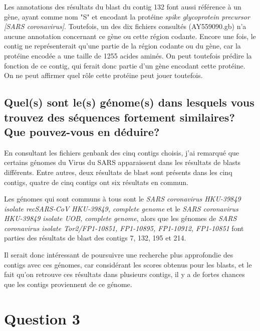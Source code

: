\documentclass[10.9pt]{article} %
\begin{document}
Les annotations des résultats du blast du contig 132 font aussi référence à un gène, ayant comme 
nom "S" et encodant la protéine \emph{spike glycoprotein precursor [SARS coronavirus]}. 
Toutefois, un des dix fichiers consultés (AY559090.gb) n'a aucune annotation concernant ce gène ou
cette région codante. Encore une fois, le contig ne représenterait qu'une partie de la 
région codante ou du gène, car la protéine encodée a une taille de 1255 acides aminés. 
On peut toutefois prédire la fonction de ce contig, qui ferait donc partie d'un gène encodant
cette protéine. On ne peut affirmer quel rôle cette protéine peut jouer toutefois.

\subsection[Génome des séquences fortement similaires]{Quel(s) sont le(s) génome(s) dans lesquels
vous trouvez des séquences fortement similaires? Que pouvez-vous en déduire?}

En consultant les fichiers genbank des cinq contigs choisis, j'ai remarqué que certains
génomes du Virus du SARS apparaissent dans les résultats de blasts différents. Entre autres,
deux résultats de blast sont présents dans les cinq contigs, quatre de cinq contigs ont six
résultats en commun.

Les génomes qui sont communs à tous sont le \emph{SARS coronavirus HKU-39849 
isolate recSARS-CoV HKU-39849, complete genome} et le \emph{SARS coronavirus HKU-39849 isolate UOB,
complete genome}, alors que les génomes de \emph{SARS coronavirus isolate Tor2/FP1-10851,
FP1-10895, FP1-10912, FP1-10851} font parties des résultats de blast des contigs 7, 132, 195 et 214.

Il serait donc intéressant de poursuivre une recherche plus approfondie des contigs avec
ces génomes, car considérant les scores obtenus pour les blasts, et le fait qu'on retrouve
ces résultats dans plusieurs contigs, il y a de fortes chances que les contigs proviennent
de ce génome.

 
\section{Question 3} %
\end{document}
